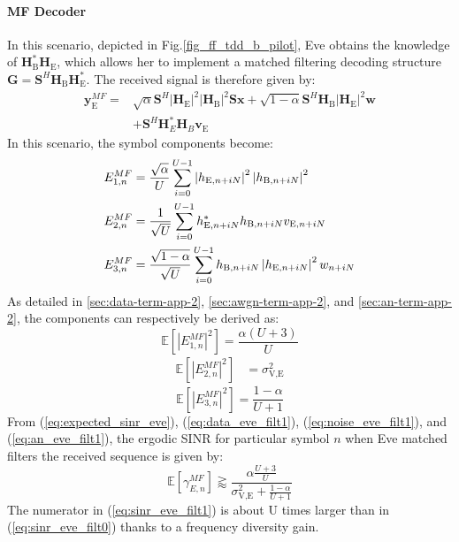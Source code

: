 \documentclass[journal,comsoc]{IEEEtran}
\newcommand{\module}[1]{\left|#1\right|}
\newcommand{\EX}[1]{\mathbb{E} \left[#1\right]}%
\newcommand{\HE}{\textbf{H}_{\text{E}}}
\newcommand{\HB}{\textbf{H}_{\text{B}}}
\newcommand{\ve}{\textbf{v}_{\text{E}}}
\newcommand{\spread}{\textbf{S}}
\newcommand{\w}{\textbf{w}}
\begin{document}
\paragraph{MF Decoder}
In this scenario, depicted in Fig.\ref{fig_ff_tdd_b_pilot}, Eve obtains the knowledge of $\HB^*\HE$, which allows her to implement a matched filtering decoding structure $\textbf{G} = \spread^H \HB\HE^*$. The received signal is therefore given by:
\begin{equation}
\begin{split}
\textbf{y}_{\text{E}}^{MF} =& \sqrt{\alpha} \spread^H \module{\HE}^2 \module{\HB}^2 \spread\textbf{x} +  \sqrt{1-\alpha} \spread^H \HB\module{\HE}^2 \w\\
&+  \spread^H  \textbf{H}^*_E \textbf{H}_B \ve
\end{split}
\label{eq:rx_eve_filt1}
\end{equation}
In this scenario, the symbol components become:
\begin{equation}
\begin{split}
E_{1,n}^{MF} &= \frac{\sqrt{\alpha}}{U}\sum_{i=0}^{U-1}  \left|h_{\text{E}, n + iN}\right|^2 \left|h_{\text{B}, n + iN}\right|^2 \\
E_{2,n}^{MF} &= \frac{1}{\sqrt{U}}\sum_{i=0}^{U-1} h^*_{\text{E}, n + iN} h_{\text{B}, n + iN} v_{\text{E}, n + iN}\\
E_{3,n}^{MF} &=\frac{ \sqrt{1-\alpha}  }{\sqrt{U}}\sum_{i=0}^{U-1}    h_{\text{\text{B}}, n + iN} \left|h_{\text{E}, n + iN}\right|^2w_{n + iN}
\end{split}
\end{equation}
As detailed in  \ref{sec:data-term-app-2},  \ref{sec:awgn-term-app-2}, and \ref{sec:an-term-app-2}, the components can respectively be derived as:
\begin{equation}
\EX{|E_{1,n}^{MF}|^2} =  \frac{\alpha (U+3)}{U}
\label{eq:data_eve_filt1}
\end{equation}
\begin{equation}
	\begin{split}
	\EX{|E_{2,n}^{MF}|^2} &= \sigma^2_{\text{V,E}}
	\end{split}
	\label{eq:noise_eve_filt1}
\end{equation}
\begin{equation}
	\EX{|E_{3,n}^{MF}|^2} = \frac{1-\alpha}{U+1}
	\label{eq:an_eve_filt1}
\end{equation}
From (\ref{eq:expected_sinr_eve}), (\ref{eq:data_eve_filt1}), (\ref{eq:noise_eve_filt1}), and (\ref{eq:an_eve_filt1}),  the ergodic SINR for particular symbol $n$ when Eve matched filters the received sequence is given by:
\begin{equation}
\EX{\gamma_{E,n}^{MF}} \gtrapprox \frac{\alpha \frac{U+3}{U}}{\sigma^2_{\text{V,E}} + \frac{1-\alpha}{U+1}}
\label{eq:sinr_eve_filt1}
\end{equation}
The numerator in (\ref{eq:sinr_eve_filt1}) is about U times larger than in (\ref{eq:sinr_eve_filt0}) thanks to a frequency diversity gain.
\end{document}
